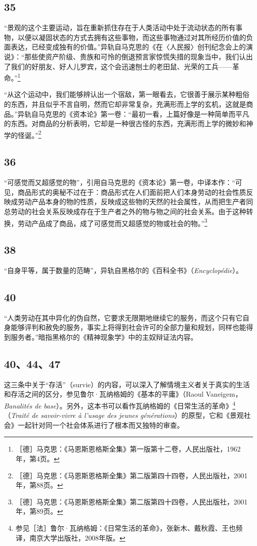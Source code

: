 \documentclass[fontset=fandol, a4paper, 12pt, openright]{ctexbook}
\begin{document}
\subsection*{35}
“景观的这个主要运动，旨在重新抓住存在于人类活动中处于流动状态的所有事物，以便以凝固状态的方式去拥有这些事物，而这些事物通过对其所经历价值的负面表达，已经变成独有的价值。”异轨自马克思的《在〈人民报〉创刊纪念会上的演说》：“那些使资产阶级、贵族和可怜的倒退预言家惊慌失措的现象当中，我们认出了我们的好朋友、好人儿罗宾，这个会迅速刨土的老田鼠、光荣的工兵——革命。”\footnote{［德］马克思：《马恩斯恩格斯全集》第一版第十二卷，人民出版社，1962年，第4页。}

“从这个运动中，我们能够辨认出一个宿敌，第一眼看去，它很善于展示某种粗俗的东西，并且似乎不言自明，然而它却非常复杂，充满形而上学的玄机，这就是商品。”异轨自马克思的《资本论》第一卷：“最初一看，上篇好像是一种简单而平凡的东西。对商品的分析表明，它却是一种很古怪的东西，充满形而上学的微妙和神学的怪诞。”\footnote{［德］马克思：《马恩斯恩格斯全集》第二版第四十四卷，人民出版社，2001年，第88页。}

\subsection*{36}
“可感觉而又超感觉的物”，引用自马克思的《资本论》第一卷，中译本作：“可见，商品形式的奥秘不过在于：商品形式在人们面前把人们本身劳动的社会性质反映成劳动产品本身的物的性质，反映成这些物的天然的社会属性，从而把生产者同总劳动的社会关系反映成存在于生产者之外的物与物之间的社会关系。由于这种转换，劳动产品成了商品，成了可感觉而又超感觉的物或社会的物。”\footnote{［德］马克思：《马恩斯恩格斯全集》第二版第四十四卷，人民出版社，2001年，第89页。}

\subsection*{38}
“自身平等，属于数量的范畴”，异轨自黑格尔的《百科全书》（\textit{Encyclopédie}）。

\subsection*{40}
“人类劳动在其中异化的伪自然，它要求无限期地继续它的服务，而这个只有它自身能够评判和赦免的服务，事实上将得到社会许可的全部力量和规划，同样也能得到服务者。”暗指黑格尔的《精神现象学》中的主奴辩证法内容。

\subsection*{40、44、47}
这三条中关于“存活”（survie）的内容，可以深入了解情境主义者关于真实的生活和存活之间的区分，参见鲁尔·瓦纳格姆的《基本的平庸》（Raoul Vaneigem，\textit{Banalités de base}）。另外，这本书可以看作瓦纳格姆的《日常生活的革命》\footnote{参见［法］鲁尔·瓦纳格姆：《日常生活的革命》，张新木、戴秋霞、王也频译，南京大学出版社，2008年版。}（\textit{Traité de savoir-vivre à l'usage des jeunes générations}）的原型，它和《景观社会》一起针对同一个社会体系进行了根本而又独特的审查。
\end{document}
